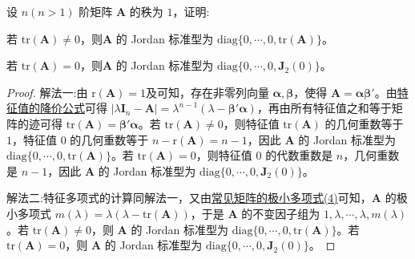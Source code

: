 \documentclass[../../main.tex]{subfiles}
\begin{document}
\begin{proposition}[秩一阵的Jordan标准型]\label{proposition:秩一阵的Jordan标准型}
设 \(n(n > 1)\) 阶矩阵 \(\boldsymbol{A}\) 的秩为 \(1\)，证明: 

若 \(\mathrm{tr}(\boldsymbol{A}) \ne 0\)，则\(\boldsymbol{A}\) 的 Jordan 标准型为 \(\mathrm{diag}\{0, \cdots, 0, \mathrm{tr}(\boldsymbol{A})\}\)。

若 \(\mathrm{tr}(\boldsymbol{A}) = 0\)，则\(\boldsymbol{A}\) 的 Jordan 标准型为 \(\mathrm{diag}\{0, \cdots, 0, \boldsymbol{J}_2(0)\}\)。
\end{proposition}
\begin{proof}
{\color{blue}解法一:}由 \(\mathrm{r}(\boldsymbol{A}) = 1\)及可知，存在非零列向量 \(\boldsymbol{\alpha}, \boldsymbol{\beta}\)，使得 \(\boldsymbol{A} = \boldsymbol{\alpha}\boldsymbol{\beta}'\)。由\hyperref[theorem:特征值的降价公式]{特征值的降价公式}可得 \(|\lambda\boldsymbol{I}_n - \boldsymbol{A}| = \lambda^{n - 1}(\lambda - \boldsymbol{\beta}'\boldsymbol{\alpha})\)，再由所有特征值之和等于矩阵的迹可得 \(\mathrm{tr}(\boldsymbol{A}) = \boldsymbol{\beta}'\boldsymbol{\alpha}\)。若 \(\mathrm{tr}(\boldsymbol{A}) \neq 0\)，则特征值 \(\mathrm{tr}(\boldsymbol{A})\) 的几何重数等于 \(1\)，特征值 \(0\) 的几何重数等于 \(n - \mathrm{r}(\boldsymbol{A}) = n - 1\)，因此 \(\boldsymbol{A}\) 的 Jordan 标准型为 \(\mathrm{diag}\{0, \cdots, 0, \mathrm{tr}(\boldsymbol{A})\}\)。若 \(\mathrm{tr}(\boldsymbol{A}) = 0\)，则特征值 \(0\) 的代数重数是 \(n\)，几何重数是 \(n - 1\)，因此 \(\boldsymbol{A}\) 的 Jordan 标准型为 \(\mathrm{diag}\{0, \cdots, 0, \boldsymbol{J}_2(0)\}\)。

{\color{blue}解法二:}特征多项式的计算同解法一，又由\hyperref[proposition:常见矩阵的极小多项式]{常见矩阵的极小多项式(4)}可知，\(\boldsymbol{A}\) 的极小多项式 \(m(\lambda) = \lambda(\lambda - \mathrm{tr}(\boldsymbol{A}))\)，于是 \(\boldsymbol{A}\) 的不变因子组为 \(1, \lambda, \cdots, \lambda, m(\lambda)\)。若 \(\mathrm{tr}(\boldsymbol{A}) \neq 0\)，则 \(\boldsymbol{A}\) 的 Jordan 标准型为 \(\mathrm{diag}\{0, \cdots, 0, \mathrm{tr}(\boldsymbol{A})\}\)。若 \(\mathrm{tr}(\boldsymbol{A}) = 0\)，则 \(\boldsymbol{A}\) 的 Jordan 标准型为 \(\mathrm{diag}\{0, \cdots, 0, \boldsymbol{J}_2(0)\}\)。


\end{proof}
\end{document}
